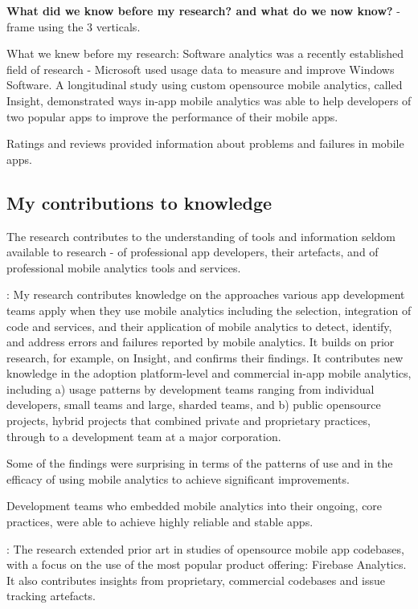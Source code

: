\textbf{What did we know before my research? and what do we now know?} - frame using the 3 verticals.

What we knew before my research:
Software analytics was a recently established field of research - Microsoft used usage data to measure and improve Windows Software. A longitudinal study using custom opensource mobile analytics, called Insight, demonstrated ways in-app mobile analytics was able to help developers of two popular apps to improve the performance of their mobile apps.

Ratings and reviews provided information about problems and failures in mobile apps.

\subsection{My contributions to knowledge}
The research contributes to the understanding of tools and information seldom available to research - of professional app developers, their artefacts, and of professional mobile analytics tools and services. 

: 
My research contributes knowledge on the approaches various app development teams apply when they use mobile analytics including the selection, integration of code and services, and their application of mobile analytics to detect, identify, and address errors and failures reported by mobile analytics. It builds on prior research, for example, on Insight, and confirms their findings. It contributes new knowledge in the adoption platform-level and commercial in-app mobile analytics, including a) usage patterns by development teams ranging from individual  developers, small teams and large,  sharded teams, and b) public opensource projects, hybrid projects that combined private and proprietary practices, through to a development team at a major corporation.

Some of the findings were surprising in terms of the patterns of use and in the efficacy of using mobile analytics to achieve significant improvements.

Development teams who embedded mobile analytics into their ongoing, core practices, were able to achieve highly reliable and stable apps. 

: 
The research extended prior art in studies of opensource mobile app codebases, with a focus on the use of the most popular product offering: Firebase Analytics. It also contributes insights from proprietary, commercial codebases and issue tracking artefacts.

